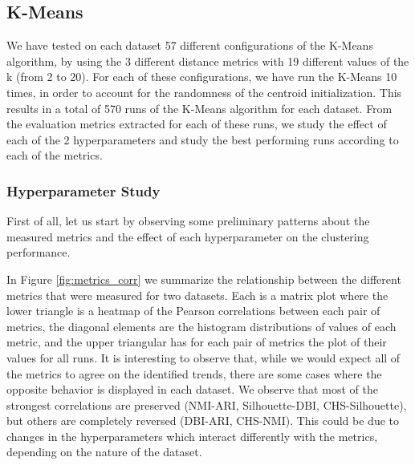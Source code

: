 \subsection{K-Means}
We have tested on each dataset 57 different configurations of the K-Means algorithm, by using the 3 different distance metrics with 19 different values of the k (from 2 to 20). For each of these configurations, we have run the K-Means 10 times, in order to account for the randomness of the centroid initialization. This results in a total of 570 runs of the K-Means algorithm for each dataset. From the evaluation metrics extracted for each of these runs, we study the effect of each of the 2 hyperparameters and study the best performing runs according to each of the metrics.

\subsubsection{Hyperparameter Study}
First of all, let us start by observing some preliminary patterns about the measured metrics and the effect of each hyperparameter on the clustering performance.

In Figure \ref{fig:metrics_corr} we summarize the relationship between the different metrics that were measured for two datasets. Each is a matrix plot where the lower triangle is a heatmap of the Pearson correlations between each pair of metrics, the diagonal elements are the histogram distributions of values of each metric, and the upper triangular has for each pair of metrics the plot of their values for all runs. It is interesting to observe that, while we would expect all of the metrics to agree on the identified trends, there are some cases where the opposite behavior is displayed in each dataset. We observe that most of the strongest correlations are preserved (NMI-ARI, Silhouette-DBI, CHS-Silhouette), but others are completely reversed (DBI-ARI, CHS-NMI). This could be due to changes in the hyperparameters which interact differently with the metrics, depending on the nature of the dataset.

